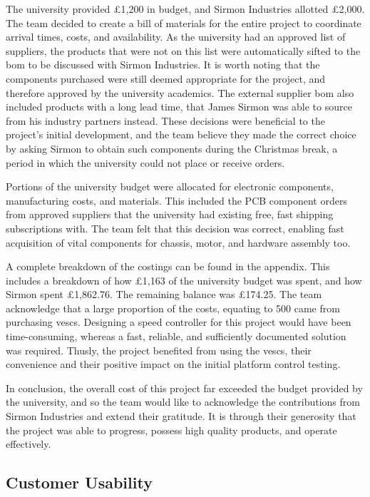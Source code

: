 \documentclass [12pt]{article}
\begin{document}
The university provided £1,200 in budget, and Sirmon Industries allotted £2,000. The team decided to create a bill of materials for the entire project to coordinate arrival times, costs, and availability. As the university had an approved list of suppliers, the products that were not on this list were automatically sifted to the \gls{bom} to be discussed with Sirmon Industries. It is worth noting that the components purchased were still deemed appropriate for the project, and therefore approved by the university academics. The external supplier \gls{bom} also included products with a long lead time, that James Sirmon was able to source from his industry partners instead. These decisions were beneficial to the project’s initial development, and the team believe they made the correct choice by asking Sirmon to obtain such components during the Christmas break, a period in which the university could not place or receive orders.

Portions of the university budget were allocated for electronic components, manufacturing costs, and materials. This included the PCB component orders from approved suppliers that the university had existing free, fast shipping subscriptions with. The team felt that this decision was correct, enabling fast acquisition of vital components for chassis, motor, and hardware assembly too.

A complete breakdown of the costings can be found in the appendix. This includes a breakdown of how £1,163 of the university budget was spent, and how Sirmon spent £1,862.76. The remaining balance was £174.25. The team acknowledge that a large proportion of the costs, equating to 500 came from purchasing \gls{vesc}s. Designing a speed controller for this project would have been time-consuming, whereas a fast, reliable, and sufficiently documented solution was required. Thusly, the project benefited from using the \gls{vesc}s, their convenience and their positive impact on the initial platform control testing.

In conclusion, the overall cost of this project far exceeded the budget provided by the university, and so the team would like to acknowledge the contributions from Sirmon Industries and extend their gratitude. It is through their generosity that the project was able to progress, possess high quality products, and operate effectively.

\subsection{Customer Usability}
\end{document}
